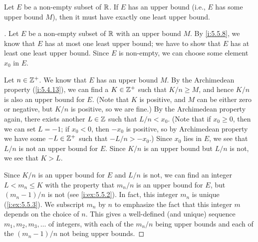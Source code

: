 \begin{thm}\label{i:5.5.9}
  Let \(E\) be a non-empty subset of \(\mathbb{R}\).
  If \(E\) has an upper bound (i.e., \(E\) has some upper bound \(M\)), then it must have exactly one least upper bound.
\end{thm}

\begin{proof}[]
  Let \(E\) be a non-empty subset of \(\mathbb{R}\) with an upper bound \(M\).
  By \cref{i:5.5.8}, we know that \(E\) has at most one least upper bound;
  we have to show that \(E\) has at least one least upper bound.
  Since \(E\) is non-empty, we can choose some element \(x_0\) in \(E\).

  Let \(n \in \mathbb{Z}^+\).
  We know that \(E\) has an upper bound \(M\).
  By the Archimedean property (\cref{i:5.4.13}), we can find a \(K \in \mathbb{Z}^+\) such that \(K / n \geq M\), and hence \(K / n\) is also an upper bound for \(E\).
  (Note that \(K\) is positive, and \(M\) can be either zero or negative, but \(K / n\) is positive, so we are fine.)
  By the Archimedean property again, there exists another \(L \in \mathbb{Z}\) such that \(L / n < x_0\).
  (Note that if \(x_0 \geq 0\), then we can set \(L = -1\); if \(x_0 < 0\), then \(-x_0\) is positive, so by Archimedean property we have some \(-L \in \mathbb{Z}^+\) such that \(-L / n > -x_0\).)
  Since \(x_0\) lies in \(E\), we see that \(L / n\) is not an upper bound for \(E\).
  Since \(K / n\) is an upper bound but \(L / n\) is not, we see that \(K > L\).

  Since \(K / n\) is an upper bound for \(E\) and \(L / n\) is not, we can find an integer \(L < m_n \leq K\) with the property that \(m_n / n\) is an upper bound for \(E\), but \((m_n - 1) / n\) is not (see \cref{i:ex:5.5.2}).
  In fact, this integer \(m_n\) is unique (\cref{i:ex:5.5.3}).
  We subscript \(m_n\) by \(n\) to emphasize the fact that this integer \(m\) depends on the choice of \(n\).
  This gives a well-defined (and unique) sequence \(m_1, m_2, m_3, \dots\) of integers, with each of the \(m_n / n\) being upper bounds and each of the \((m_n - 1) / n\) not being upper bounds.


\end{proof}
